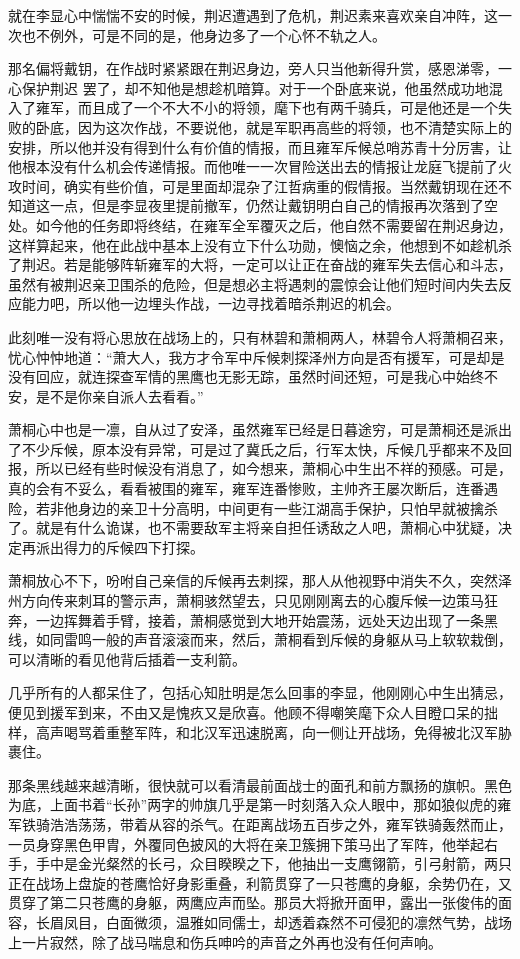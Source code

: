 就在李显心中惴惴不安的时候，荆迟遭遇到了危机，荆迟素来喜欢亲自冲阵，这一次也不例外，可是不同的是，他身边多了一个心怀不轨之人。

那名偏将戴钥，在作战时紧紧跟在荆迟身边，旁人只当他新得升赏，感恩涕零，一心保护荆迟 罢了，却不知他是想趁机暗算。对于一个卧底来说，他虽然成功地混入了雍军，而且成了一个不大不小的将领，麾下也有两千骑兵，可是他还是一个失败的卧底，因为这次作战，不要说他，就是军职再高些的将领，也不清楚实际上的安排，所以他并没有得到什么有价值的情报，而且雍军斥候总哨苏青十分厉害，让他根本没有什么机会传递情报。而他唯一一次冒险送出去的情报让龙庭飞提前了火攻时间，确实有些价值，可是里面却混杂了江哲病重的假情报。当然戴钥现在还不知道这一点，但是李显夜里提前撤军，仍然让戴钥明白自己的情报再次落到了空处。如今他的任务即将终结，在雍军全军覆灭之后，他自然不需要留在荆迟身边，这样算起来，他在此战中基本上没有立下什么功勋，懊恼之余，他想到不如趁机杀了荆迟。若是能够阵斩雍军的大将，一定可以让正在奋战的雍军失去信心和斗志，虽然有被荆迟亲卫围杀的危险，但是想必主将遇刺的震惊会让他们短时间内失去反应能力吧，所以他一边埋头作战，一边寻找着暗杀荆迟的机会。

此刻唯一没有将心思放在战场上的，只有林碧和萧桐两人，林碧令人将萧桐召来，忧心忡忡地道：“萧大人，我方才令军中斥候刺探泽州方向是否有援军，可是却是没有回应，就连探查军情的黑鹰也无影无踪，虽然时间还短，可是我心中始终不安，是不是你亲自派人去看看。”

萧桐心中也是一凛，自从过了安泽，虽然雍军已经是日暮途穷，可是萧桐还是派出了不少斥候，原本没有异常，可是过了冀氏之后，行军太快，斥候几乎都来不及回报，所以已经有些时候没有消息了，如今想来，萧桐心中生出不祥的预感。可是，真的会有不妥么，看看被围的雍军，雍军连番惨败，主帅齐王屡次断后，连番遇险，若非他身边的亲卫十分高明，中间更有一些江湖高手保护，只怕早就被擒杀了。就是有什么诡谋，也不需要敌军主将亲自担任诱敌之人吧，萧桐心中犹疑，决定再派出得力的斥候四下打探。

萧桐放心不下，吩咐自己亲信的斥候再去刺探，那人从他视野中消失不久，突然泽州方向传来刺耳的警示声，萧桐骇然望去，只见刚刚离去的心腹斥候一边策马狂奔，一边挥舞着手臂，接着，萧桐感觉到大地开始震荡，远处天边出现了一条黑线，如同雷鸣一般的声音滚滚而来，然后，萧桐看到斥候的身躯从马上软软栽倒，可以清晰的看见他背后插着一支利箭。

几乎所有的人都呆住了，包括心知肚明是怎么回事的李显，他刚刚心中生出猜忌，便见到援军到来，不由又是愧疚又是欣喜。他顾不得嘲笑麾下众人目瞪口呆的拙样，高声喝骂着重整军阵，和北汉军迅速脱离，向一侧让开战场，免得被北汉军胁裹住。

那条黑线越来越清晰，很快就可以看清最前面战士的面孔和前方飘扬的旗帜。黑色为底，上面书着“长孙”两字的帅旗几乎是第一时刻落入众人眼中，那如狼似虎的雍军铁骑浩浩荡荡，带着从容的杀气。在距离战场五百步之外，雍军铁骑轰然而止，一员身穿黑色甲胄，外覆同色披风的大将在亲卫簇拥下策马出了军阵，他举起右手，手中是金光粲然的长弓，众目睽睽之下，他抽出一支鹰翎箭，引弓射箭，两只正在战场上盘旋的苍鹰恰好身影重叠，利箭贯穿了一只苍鹰的身躯，余势仍在，又贯穿了第二只苍鹰的身躯，两鹰应声而坠。那员大将掀开面甲，露出一张俊伟的面容，长眉凤目，白面微须，温雅如同儒士，却透着森然不可侵犯的凛然气势，战场上一片寂然，除了战马喘息和伤兵呻吟的声音之外再也没有任何声响。

